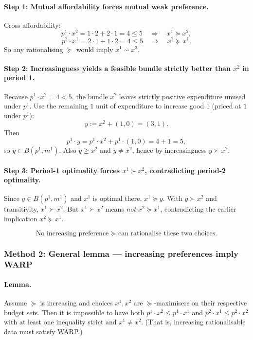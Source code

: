 \documentclass[12pt]{article}
\begin{document}
\paragraph{Step 1: Mutual affordability forces mutual weak preference.}
Cross-affordability:
\[
p^{1}\cdot x^{2} = 1\cdot 2 + 2\cdot 1 = 4 \le 5
\quad\Rightarrow\quad
x^{1}\succeq x^{2},
\]
\[
p^{2}\cdot x^{1} = 2\cdot 1 + 1\cdot 2 = 4 \le 5
\quad\Rightarrow\quad
x^{2}\succeq x^{1}.
\]
So any rationalising \(\succeq\) would imply \(x^1\sim x^2\).

\paragraph{Step 2: Increasingness yields a feasible bundle strictly better than \(x^2\) in period 1.}
Because \(p^{1}\cdot x^{2}=4<5\), the bundle \(x^{2}\) leaves strictly positive expenditure unused under \(p^1\).
Use the remaining \(1\) unit of expenditure to increase good 1 (priced at \(1\) under \(p^1\)):
\[
y := x^{2} + (1,0) = (3,1).
\]
Then
\[
p^{1}\cdot y = p^{1}\cdot x^{2} + p^{1}\cdot(1,0)=4+1=5,
\]
so \(y\in B(p^{1},m^1)\). Also \(y\ge x^2\) and \(y\neq x^2\), hence by increasingness \(y\succ x^2\).

\paragraph{Step 3: Period-1 optimality forces \(x^1\succ x^2\), contradicting period-2 optimality.}
Since \(y\in B(p^1,m^1)\) and \(x^1\) is optimal there, \(x^1\succeq y\). With \(y\succ x^2\) and transitivity, \(x^1\succ x^2\).
But \(x^1\succ x^2\) means \emph{not} \(x^2\succeq x^1\), contradicting the earlier implication \(x^2\succeq x^1\).

\[
\boxed{\text{No increasing preference \(\succeq\) can rationalise these two choices.}}
\]

\subsubsection*{Method 2: General lemma --- increasing preferences imply WARP}
\paragraph{Lemma.}
Assume \(\succeq\) is increasing and choices \(x^1,x^2\) are \(\succeq\)-maximisers on their respective budget sets.
Then it is impossible to have both \(p^1\cdot x^2\le p^1\cdot x^1\) and \(p^2\cdot x^1\le p^2\cdot x^2\) with at least one inequality strict and \(x^1\neq x^2\).
(That is, increasing rationalisable data must satisfy WARP.)
\end{document}
